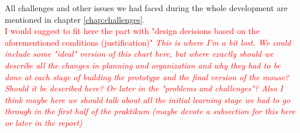 \noindent
All challenges and other issues we had faced during the whole development are mentioned in chapter \ref{chap:challenges}.\\

\textcolor{red}{I would suggest to fit here the part with "design decisions based on the aforementioned conditions (justification)"
\textit{ This is where I'm a bit lost. We could include some "ideal" version of this chart here, but where exactly should we describe all the changes in planning and organization and why they had to be done at each stage of building the prototype and the final version of the mouse?  Should it be described here? Or later in the "problems and challenges"?
Also I think maybe here we should talk about all the initial learning stage we had to go through in the first half of the praktikum (maybe devote a subsection for this here or later in the report)}}

